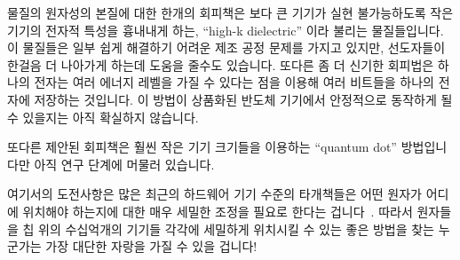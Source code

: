 \iffalse
Stephen Hawking is said to have claimed that semiconductor manufacturers
have but two fundamental problems: (1) the finite speed of light and
(2) the atomic nature of matter~\cite{BryanGardiner2007}.
It is possible that semiconductor manufacturers are approaching these
limits, but there are nevertheless a few avenues of research and
development focused on working around these fundamental limits.
\fi

물질의 원자성의 본질에 대한 한개의 회피책은 보다 큰 기기가 실현 불가능하도록
작은 기기의 전자적 특성을 흉내내게 하는, ``high-k dielectric'' 이라 불리는
물질들입니다.
이 물질들은 일부 쉽게 해결하기 어려운 제조 공정 문제를 가지고 있지만,
선도자들이 한걸음 더 나아가게 하는데 도움을 줄수도 있습니다.
또다른 좀 더 신기한 회피법은 하나의 전자는 여러 에너지 레벨을 가질 수 있다는
점을 이용해 여러 비트들을 하나의 전자에 저장하는 것입니다.
이 방법이 상품화된 반도체 기기에서 안정적으로 동작하게 될 수 있을지는 아직
확실하지 않습니다.

또다른 제안된 회피책은 훨씬 작은 기기 크기들을 이용하는 ``quantum dot''
방법입니다만 아직 연구 단계에 머물러 있습니다.

\iffalse
One workaround for the atomic nature of matter are so-called
``high-K dielectric'' materials, which allow larger devices to mimic the
electrical properties of infeasibly small devices.
These materials pose some severe fabrication challenges, but nevertheless
may help push the frontiers out a bit farther.
Another more-exotic workaround stores multiple bits in a single electron,
relying on the fact that a given electron can exist at a number of
energy levels.
It remains to be seen if this particular approach can be made to work
reliably in production semiconductor devices.

Another proposed workaround is the ``quantum dot'' approach that
allows much smaller device sizes, but which is still in the research
stage.
\fi

여기서의 도전사항은 많은 최근의 하드웨어 기기 수준의 타개책들은 어떤 원자가
어디에 위치해야 하는지에 대한 매우 세밀한 조정을 필요로 한다는
겁니다~\cite{MichaelJKelly2017DeviceLevel}.
따라서 원자들을 칩 위의 수십억개의 기기들 각각에 세밀하게 위치시킬 수 있는 좋은
방법을 찾는 누군가는 가장 대단한 자랑을 가질 수 있을 겁니다!
\iffalse

One challenge is that many recent hardware-device-level breakthroughs
require very tight control of which atoms are placed
where~\cite{MichaelJKelly2017DeviceLevel}.
It therefore seems likely that whoever finds a good way to hand-place
atoms on each of the billions of devices on a chip will have most
excellent bragging rights, if nothing else!
\fi

